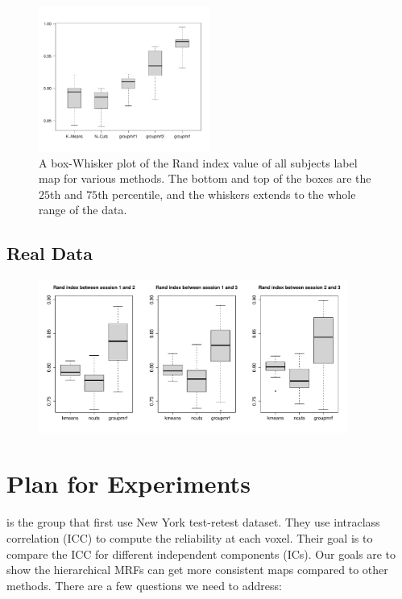 \documentclass[final,authoryear,5p,twocolumn]{elsarticle}
\begin{document}
\begin{figure}[htb]
  \centering
  \includegraphics[width=0.5\textwidth]{figures/syn/rainplot}
  \caption{A box-Whisker plot of the Rand index value of all subjects label map
    for various methods. The bottom and top of the boxes are the $25$th and
    $75$th percentile, and the whiskers extends to the whole range of the data.}
  \label{fig:synboxplot}
\end{figure}

\subsection{Real Data}
\begin{figure}[htb]
  \centering
  \includegraphics[width=0.9\textwidth]{rainlog/boxplot}
  \caption{}
  \label{fig:boxplot}
\end{figure}

\appendix
\section{Plan for Experiments}
\cite{zuo2010reliable} is the group that first use New York test-retest
dataset. They use intraclass correlation (ICC) to compute the reliability at
each voxel. Their goal is to compare the ICC for different independent
components (ICs). Our goals are to show the hierarchical MRFs can get more
consistent maps compared to other methods. There are a few questions we need to
address:
\end{document}
